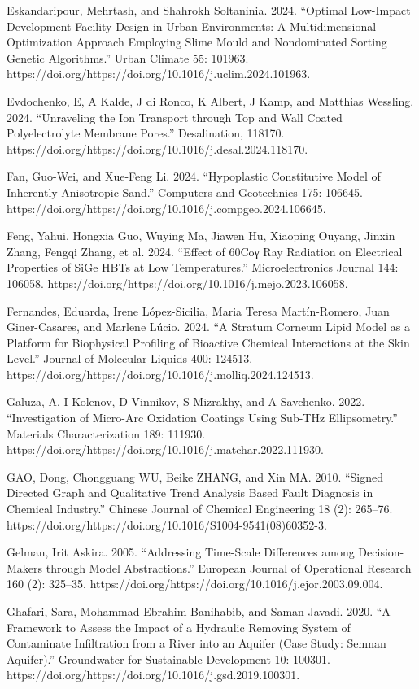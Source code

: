 \documentclass[utf8]{gradu3}
\begin{document}
Eskandaripour, Mehrtash, and Shahrokh Soltaninia. 2024. “Optimal Low-Impact Development Facility Design in Urban Environments: A Multidimensional Optimization Approach Employing Slime Mould and Nondominated Sorting Genetic Algorithms.” Urban Climate 55: 101963. https://doi.org/https://doi.org/10.1016/j.uclim.2024.101963.

Evdochenko, E, A Kalde, J di Ronco, K Albert, J Kamp, and Matthias Wessling. 2024. “Unraveling the Ion Transport through Top and Wall Coated Polyelectrolyte Membrane Pores.” Desalination, 118170. https://doi.org/https://doi.org/10.1016/j.desal.2024.118170.

Fan, Guo-Wei, and Xue-Feng Li. 2024. “Hypoplastic Constitutive Model of Inherently Anisotropic Sand.” Computers and Geotechnics 175: 106645. https://doi.org/https://doi.org/10.1016/j.compgeo.2024.106645.

Feng, Yahui, Hongxia Guo, Wuying Ma, Jiawen Hu, Xiaoping Ouyang, Jinxin Zhang, Fengqi Zhang, et al. 2024. “Effect of 60Coγ Ray Radiation on Electrical Properties of SiGe HBTs at Low Temperatures.” Microelectronics Journal 144: 106058. https://doi.org/https://doi.org/10.1016/j.mejo.2023.106058.

Fernandes, Eduarda, Irene López-Sicilia, Maria Teresa Martín-Romero, Juan Giner-Casares, and Marlene Lúcio. 2024. “A Stratum Corneum Lipid Model as a Platform for Biophysical Profiling of Bioactive Chemical Interactions at the Skin Level.” Journal of Molecular Liquids 400: 124513. https://doi.org/https://doi.org/10.1016/j.molliq.2024.124513.

Galuza, A, I Kolenov, D Vinnikov, S Mizrakhy, and A Savchenko. 2022. “Investigation of Micro-Arc Oxidation Coatings Using Sub-THz Ellipsometry.” Materials Characterization 189: 111930. https://doi.org/https://doi.org/10.1016/j.matchar.2022.111930.

GAO, Dong, Chongguang WU, Beike ZHANG, and Xin MA. 2010. “Signed Directed Graph and Qualitative Trend Analysis Based Fault Diagnosis in Chemical Industry.” Chinese Journal of Chemical Engineering 18 (2): 265–76. https://doi.org/https://doi.org/10.1016/S1004-9541(08)60352-3.

Gelman, Irit Askira. 2005. “Addressing Time-Scale Differences among Decision-Makers through Model Abstractions.” European Journal of Operational Research 160 (2): 325–35. https://doi.org/https://doi.org/10.1016/j.ejor.2003.09.004.

Ghafari, Sara, Mohammad Ebrahim Banihabib, and Saman Javadi. 2020. “A Framework to Assess the Impact of a Hydraulic Removing System of Contaminate Infiltration from a River into an Aquifer (Case Study: Semnan Aquifer).” Groundwater for Sustainable Development 10: 100301. https://doi.org/https://doi.org/10.1016/j.gsd.2019.100301.
\end{document}
